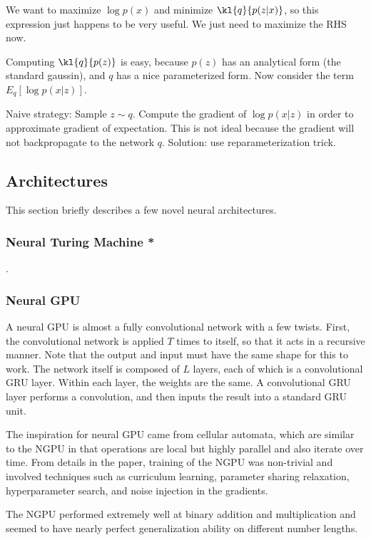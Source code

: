\documentclass[12pt]{article}
\begin{document}
We want to maximize $\log p(x)$ and minimize $\kl{q}{p(z|x)}$, so this expression just happens to be very useful. We just need to maximize the RHS now.

Computing $\kl{q}{p(z)}$ is easy, because $p(z)$ has an analytical form (the standard gaussin), and $q$ has a nice parameterized form. Now consider the term $E_q[\log p(x|z)]$. 

Naive strategy: Sample $z \sim q$. Compute the gradient of $\log p(x|z)$ in order to approximate gradient of expectation. This is not ideal because the gradient will not backpropagate to the network $q$. Solution: use reparameterization trick.  

\subsection{Architectures }

This section briefly describes a few novel neural architectures.

\subsubsection{Neural Turing Machine *}
.
\subsubsection{Neural GPU}

A neural GPU is almost a fully convolutional network with a few twists. First, the convolutional network is applied $T$ times to itself, so that it acts in a recursive manner. Note that the output and input must have the same shape for this to work. The network itself is composed of $L$ layers, each of which is a convolutional GRU layer. Within each layer, the weights are the same. A convolutional GRU layer performs a convolution, and then inputs the result into a standard GRU unit. 

The inspiration for neural GPU came from cellular automata, which are similar to the NGPU in that operations are local but highly parallel and also iterate over time. From details in the paper, training of the NGPU was non-trivial and involved techniques such as curriculum learning, parameter sharing relaxation, hyperparameter search, and noise injection in the gradients.

The NGPU performed extremely well at binary addition and multiplication and seemed to have nearly perfect generalization ability on different number lengths.
\end{document}
